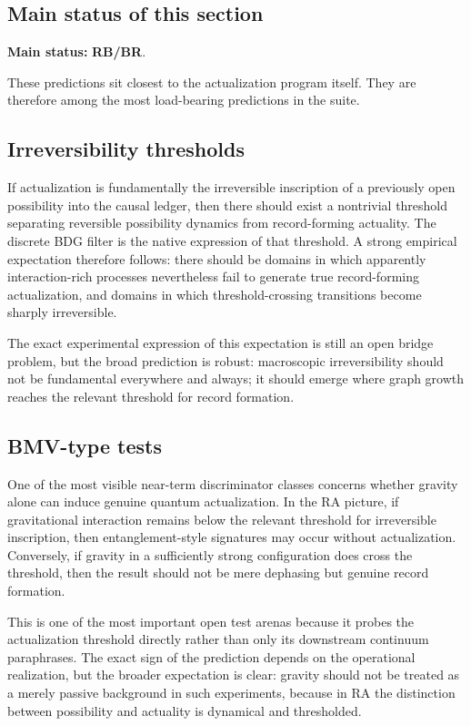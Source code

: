 \documentclass[11pt]{article}
\begin{document}
\subsection{Main status of this section}
\textbf{Main status:} \textbf{RB/BR}.

These predictions sit closest to the actualization program itself. They are therefore among the most load-bearing predictions in the suite.

\subsection{Irreversibility thresholds}
If actualization is fundamentally the irreversible inscription of a previously open possibility into the causal ledger, then there should exist a nontrivial threshold separating reversible possibility dynamics from record-forming actuality. The discrete BDG filter is the native expression of that threshold. A strong empirical expectation therefore follows: there should be domains in which apparently interaction-rich processes nevertheless fail to generate true record-forming actualization, and domains in which threshold-crossing transitions become sharply irreversible.

The exact experimental expression of this expectation is still an open bridge problem, but the broad prediction is robust: macroscopic irreversibility should not be fundamental everywhere and always; it should emerge where graph growth reaches the relevant threshold for record formation.

\subsection{BMV-type tests}
One of the most visible near-term discriminator classes concerns whether gravity alone can induce genuine quantum actualization. In the RA picture, if gravitational interaction remains below the relevant threshold for irreversible inscription, then entanglement-style signatures may occur without actualization. Conversely, if gravity in a sufficiently strong configuration does cross the threshold, then the result should not be mere dephasing but genuine record formation.

This is one of the most important open test arenas because it probes the actualization threshold directly rather than only its downstream continuum paraphrases. The exact sign of the prediction depends on the operational realization, but the broader expectation is clear: gravity should not be treated as a merely passive background in such experiments, because in RA the distinction between possibility and actuality is dynamical and thresholded.
\end{document}

